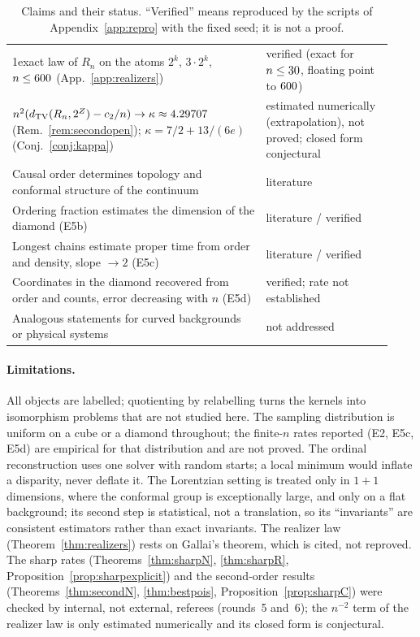 \documentclass[11pt,a4paper]{article}
\providecommand{\HasSecond}{0}
\theoremstyle{plain}
\theoremstyle{definition}
\theoremstyle{remark}
\begin{document}
\begin{table}[p]
\begin{tabular}{p{0.62\linewidth}>{\raggedright\arraybackslash}p{0.31\linewidth}}
\if\HasSecond1\quad exact law of $R_n$ on the atoms $2^k$, $3\cdot2^k$, $n\le600$ (App.~\ref{app:realizers}) & verified (exact for $n\le30$, floating point to $600$)\\
\fi $n^2(d_{\mathrm{TV}}(R_n,2^Z)-c_2/n)\to\kappa\approx4.29707$ (Rem.~\ref{rem:secondopen}); $\kappa=7/2+13/(6e)$ (Conj.~\ref{conj:kappa}) & estimated numerically (extrapolation), not proved; closed form conjectural\\
Causal order determines topology and conformal structure of the continuum & literature\\
Ordering fraction estimates the dimension of the diamond (E5b) & literature / verified\\
Longest chains estimate proper time from order and density, slope $\to2$ (E5c) & literature / verified\\
Coordinates in the diamond recovered from order and counts, error decreasing with $n$ (E5d) & verified; rate not established\\
Analogous statements for curved backgrounds or physical systems & not addressed\\
\bottomrule
\end{tabular}
\caption{Claims and their status. ``Verified'' means reproduced by the scripts of Appendix~\ref{app:repro} with the fixed seed; it is not a proof.}
\label{tab:claims}
\end{table}

\paragraph{Limitations.} All objects are labelled; quotienting by relabelling turns the kernels into isomorphism problems that are not studied here. The sampling distribution is uniform on a cube or a diamond throughout; the finite-$n$ rates reported (E2, E5c, E5d) are empirical for that distribution and are not proved. The ordinal reconstruction uses one solver with random starts; a local minimum would inflate a disparity, never deflate it. The Lorentzian setting is treated only in $1{+}1$ dimensions, where the conformal group is exceptionally large, and only on a flat background; its second step is statistical, not a translation, so its ``invariants'' are consistent estimators rather than exact invariants. The realizer law (Theorem~\ref{thm:realizers}) rests on Gallai's theorem, which is cited, not reproved. The sharp rates (Theorems~\ref{thm:sharpN}, \ref{thm:sharpR}, Proposition~\ref{prop:sharpexplicit}) and the second-order results (Theorems~\ref{thm:secondN}, \ref{thm:bestpois}, Proposition~\ref{prop:sharpC}) were checked by internal, not external, referees (rounds~5 and~6); the $n^{-2}$ term of the realizer law is only estimated numerically and its closed form is conjectural.
\end{document}
